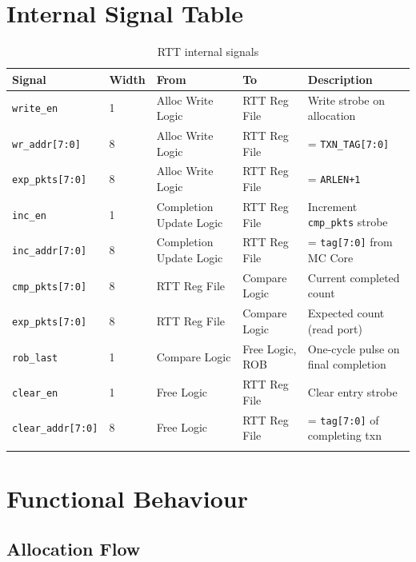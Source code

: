\documentclass[11pt,a4paper]{article}
\begin{document}
\section{Internal Signal Table}

\begin{longtable}{p{2.8cm}p{1cm}p{2.5cm}p{2.5cm}p{5.5cm}}
\toprule
\textbf{Signal} & \textbf{Width} & \textbf{From} & \textbf{To} & \textbf{Description} \\
\midrule
\texttt{write\_en}        & 1   & Alloc Write Logic       & RTT Reg File         & Write strobe on allocation \\
\texttt{wr\_addr[7:0]}    & 8   & Alloc Write Logic       & RTT Reg File         & = \texttt{TXN\_TAG[7:0]} \\
\texttt{exp\_pkts[7:0]}   & 8   & Alloc Write Logic       & RTT Reg File         & = \texttt{ARLEN+1} \\
\texttt{inc\_en}          & 1   & Completion Update Logic & RTT Reg File         & Increment \texttt{cmp\_pkts} strobe \\
\texttt{inc\_addr[7:0]}   & 8   & Completion Update Logic & RTT Reg File         & = \texttt{tag[7:0]} from MC Core \\
\texttt{cmp\_pkts[7:0]}   & 8   & RTT Reg File            & Compare Logic        & Current completed count \\
\texttt{exp\_pkts[7:0]}   & 8   & RTT Reg File            & Compare Logic        & Expected count (read port) \\
\texttt{rob\_last}        & 1   & Compare Logic           & Free Logic, ROB      & One-cycle pulse on final completion \\
\texttt{clear\_en}        & 1   & Free Logic              & RTT Reg File         & Clear entry strobe \\
\texttt{clear\_addr[7:0]} & 8   & Free Logic              & RTT Reg File         & = \texttt{tag[7:0]} of completing txn \\
\bottomrule
\caption{RTT internal signals}
\end{longtable}

\section{Functional Behaviour}

\subsection{Allocation Flow}
\end{document}
